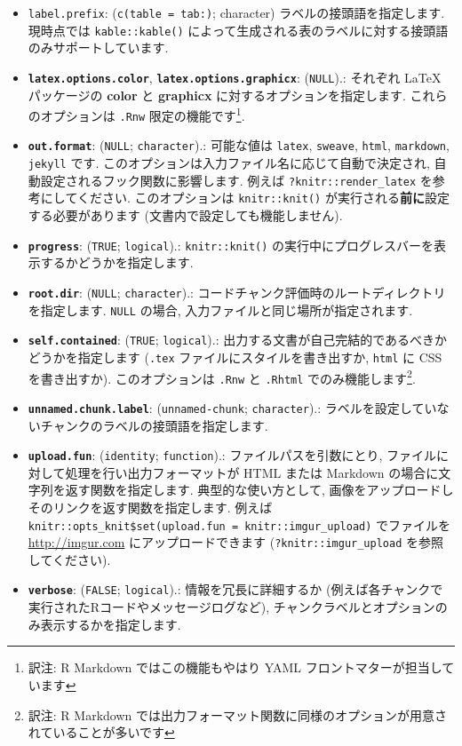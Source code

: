 \documentclass[
  11pt,
]{bxjsreport}
\begin{document}
\begin{itemize}
\item
  \texttt{label.prefix}: (\texttt{c(table = \textquotesingle{}tab:\textquotesingle{})}; character) ラベルの接頭語を指定します. 現時点では \texttt{kable::kable()} によって生成される表のラベルに対する接頭語のみサポートしています.
\item
  \textbf{\texttt{latex.options.color}}, \textbf{\texttt{latex.options.graphicx}}: (\texttt{NULL}).: それぞれ LaTeX パッケージの \textbf{color} と \textbf{graphicx} に対するオプションを指定します. これらのオプションは \texttt{.Rnw} 限定の機能です\footnote{訳注: R Markdown ではこの機能もやはり YAML フロントマターが担当しています}.
\item
  \textbf{\texttt{out.format}}: (\texttt{NULL}; \texttt{character}).: 可能な値は \texttt{latex}, \texttt{sweave}, \texttt{html}, \texttt{markdown}, \texttt{jekyll} です. このオプションは入力ファイル名に応じて自動で決定され, 自動設定されるフック関数に影響します. 例えば \texttt{?knitr::render\_latex} を参考にしてください. このオプションは \texttt{knitr::knit()} が実行される\textbf{前に}設定する必要があります (文書内で設定しても機能しません).
\item
  \textbf{\texttt{progress}}: (\texttt{TRUE}; \texttt{logical}).: \texttt{knitr::knit()} の実行中にプログレスバーを表示するかどうかを指定します.
\item
  \textbf{\texttt{root.dir}}: (\texttt{NULL}; \texttt{character}).: コードチャンク評価時のルートディレクトリを指定します. \texttt{NULL} の場合, 入力ファイルと同じ場所が指定されます.
\item
  \textbf{\texttt{self.contained}}: (\texttt{TRUE}; \texttt{logical}).: 出力する文書が自己完結的であるべきかどうかを指定します (\texttt{.tex} ファイルにスタイルを書き出すか, \texttt{html} に CSS を書き出すか). このオプションは \texttt{.Rnw} と \texttt{.Rhtml} でのみ機能します\footnote{訳注: R Markdown では出力フォーマット関数に同様のオプションが用意されていることが多いです}.
\item
  \textbf{\texttt{unnamed.chunk.label}}: (\texttt{unnamed-chunk}; \texttt{character}).: ラベルを設定していないチャンクのラベルの接頭語を指定します.
\item
  \textbf{\texttt{upload.fun}}: (\texttt{identity}; \texttt{function}).: ファイルパスを引数にとり, ファイルに対して処理を行い出力フォーマットが HTML または Markdown の場合に文字列を返す関数を指定します. 典型的な使い方として, 画像をアップロードしそのリンクを返す関数を指定します. 例えば \texttt{knitr::opts\_knit\$set(upload.fun = knitr::imgur\_upload)} でファイルを \url{http://imgur.com} にアップロードできます (\texttt{?knitr::imgur\_upload} を参照してください).
\item
  \textbf{\texttt{verbose}}: (\texttt{FALSE}; \texttt{logical}).: 情報を冗長に詳細するか (例えば各チャンクで実行されたRコードやメッセージログなど), チャンクラベルとオプションのみ表示するかを指定します.
\end{itemize}

\backmatter



\printbibliography[title=参考文献,heading=bibintoc]


\printindex
\end{document}
